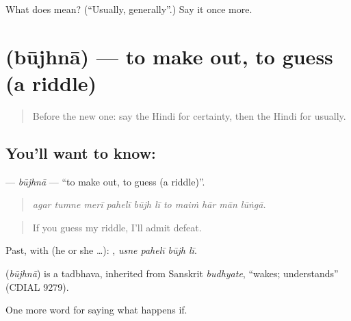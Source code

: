 \begin{tcolorbox}[breakable,colback=teal!4,colframe=teal!35!black,title={Before you move on}]
What does  mean? (\textquotedblleft{}Usually, generally\textquotedblright{}.) Say it once more.
\end{tcolorbox}
\section[\texorpdfstring{\hi{बूझना} (būjhnā)}{बूझना (būjhnā)}]{ (būjhnā) — to make out, to guess (a riddle)}

\label{lesson:HI-C374-buujhna}



\begin{quote}
Before the new one: say the Hindi for certainty, then the Hindi for usually.
\end{quote}

\subsection*{You'll want to know: }
\textbf{} — \emph{būjhnā} — \textquotedblleft{}to make out, to guess (a riddle)\textquotedblright{}.

\begin{quote}
          
\end{quote}

\begin{quote}
\emph{agar tumne merī pahelī būjh lī to maiṁ hār mān lūṅgā.}
\end{quote}

\begin{quote}
If you guess my riddle, I'll admit defeat.
\end{quote}

Past, with  (he or she …):    , \emph{usne pahelī būjh lī}.

\begin{cousinweb}
\textbf{} (\emph{būjhnā}) is a tadbhava, inherited from Sanskrit \emph{budhyate}, \textquotedblleft{}wakes; understands\textquotedblright{} (CDIAL 9279).
\end{cousinweb}

\begin{grammarlens}[title={What you've built}]
One more word for saying what happens if.
\end{grammarlens}

